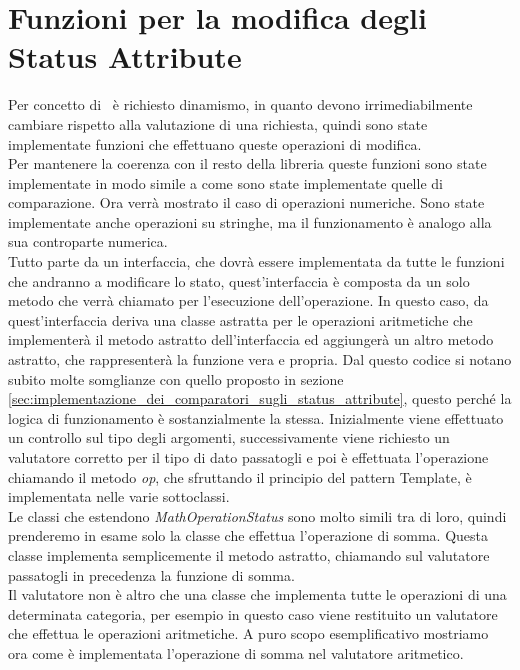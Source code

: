 \section{Funzioni per la modifica degli Status Attribute} %
\label{sec:funzioni_aritmetiche_per_la_modifica_degli_statusattribute}
Per concetto di \statusattribute \ è  richiesto dinamismo, in quanto devono irrimediabilmente cambiare rispetto alla valutazione di una richiesta, quindi sono state implementate funzioni che effettuano queste operazioni di modifica.\\
Per mantenere la coerenza con il resto della libreria queste funzioni sono state implementate in modo simile a come sono state implementate quelle di comparazione.
Ora verrà mostrato il caso di operazioni numeriche. Sono state implementate anche operazioni su stringhe, ma il funzionamento è analogo alla sua controparte numerica.\\
Tutto parte da un interfaccia, che dovrà essere implementata da tutte le funzioni che andranno a modificare lo stato, quest'interfaccia è composta da un solo metodo che verrà chiamato per l'esecuzione dell'operazione.
In questo caso, da quest'interfaccia deriva una classe astratta per le operazioni aritmetiche che implementerà il metodo astratto dell'interfaccia ed aggiungerà un altro metodo astratto, che rappresenterà la funzione vera e propria.
Dal questo codice si notano subito molte somglianze con quello proposto in sezione \ref{sec:implementazione_dei_comparatori_sugli_status_attribute}, questo perché la logica di funzionamento è sostanzialmente la stessa.
Inizialmente viene effettuato un controllo sul tipo degli argomenti, successivamente viene richiesto un valutatore corretto per il tipo di dato passatogli e poi è effettuata l'operazione chiamando il metodo \textit{op}, che sfruttando il principio del pattern Template, è implementata nelle varie sottoclassi.\\
Le classi che estendono \textit{MathOperationStatus} sono molto simili tra di loro, quindi prenderemo in esame solo la classe che effettua l'operazione di somma.
Questa classe implementa semplicemente il metodo astratto, chiamando sul valutatore passatogli in precedenza la funzione di somma.\\
Il valutatore non è altro che una classe che implementa tutte le operazioni di una determinata categoria, per esempio in questo caso viene restituito un valutatore che effettua le operazioni aritmetiche.
A puro scopo esemplificativo mostriamo ora come è implementata l'operazione di somma nel valutatore aritmetico.

